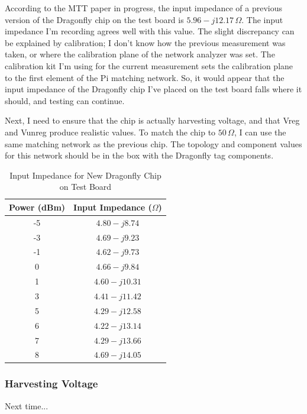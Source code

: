 \documentclass[12pt,onecolumn,titlepage]{article}
\begin{document}
According to the MTT paper in progress, the input impedance of a previous version of the Dragonfly chip on the test board is $5.96 - j12.17 \, \Omega$. The input impedance I'm recording agrees well with this value. The slight discrepancy can be explained by calibration; I don't know how the previous measurement was taken, or where the calibration plane of the network analyzer was set. The calibration kit I'm using for the current measurement sets the calibration plane to the first element of the Pi matching network. So, it would appear that the input impedance of the Dragonfly chip I've placed on the test board falls where it should, and testing can continue.

Next, I need to ensure that the chip is actually harvesting voltage, and that Vreg and Vunreg produce realistic values. To match the chip to $50 \, \Omega$, I can use the same matching network as the previous chip. The topology and component values for this network should be in the box with the Dragonfly tag components.



\begin{table}[h!]
\centering
	\caption{Input Impedance for New Dragonfly Chip on Test Board}
	\begin{tabular}{| c | c |}
	\hline
	 Power (dBm) & Input Impedance ($\Omega$) \\ \hline
	 -5 & $4.80 - j 8.74$ \\ \hline
	 -3 & $4.69 - j 9.23$ \\ \hline
	 -1 & $4.62 - j 9.73$ \\ \hline
	 0 & $4.66 - j 9.84$ \\ \hline
	 1 & $4.60 - j 10.31$ \\ \hline
	 3 & $4.41 - j 11.42$ \\ \hline
	 5 & $4.29 - j 12.58$ \\ \hline
	 6 & $4.22 - j 13.14$ \\ \hline
	 7 & $4.29 - j 13.66$ \\ \hline
	 8 & $4.69 - j 14.05$ \\ \hline
	\end{tabular}
\label{tab:new_chip_impedance}
\end{table}



\subsubsection{Harvesting Voltage}
\indent \indent Next time...
\end{document}

